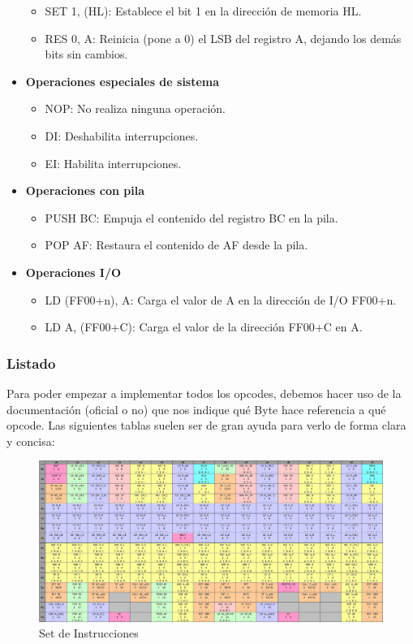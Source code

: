 \begin{itemize}
\begin{itemize}
  \item SET 1, (HL): Establece el bit 1 en la dirección de memoria HL.
  \item RES 0, A: Reinicia (pone a 0) el LSB del registro A, dejando los demás bits sin cambios.
  \end{itemize}
  \item \textbf{Operaciones especiales de sistema}
  \begin{itemize}
  \item NOP: No realiza ninguna operación.
  \item DI: Deshabilita interrupciones.
  \item EI: Habilita interrupciones.
  \end{itemize}
  \item \textbf{Operaciones con pila}
  \begin{itemize}
  \item PUSH BC: Empuja el contenido del registro BC en la pila.
  \item POP AF: Restaura el contenido de AF desde la pila.
  \end{itemize}
  \item \textbf{Operaciones I/O}
  \begin{itemize}
  \item LD (FF00+n), A: Carga el valor de A en la dirección de I/O FF00+n.
  \item LD A, (FF00+C): Carga el valor de la dirección FF00+C en A.
  \end{itemize}
\end{itemize}

\subsubsection{Listado}
Para poder empezar a implementar todos los opcodes, debemos hacer uso de la documentación (oficial o no) que nos indique qué Byte hace referencia a qué opcode. Las siguientes tablas suelen ser de gran ayuda para verlo de forma clara y concisa:

\begin{figure}[H]
\centering
\includegraphics[width=1\textwidth]{include/images/opcodes_1.jpg}
\caption{Set de Instrucciones}
\label{figure:opcodes_1}
\end{figure}

